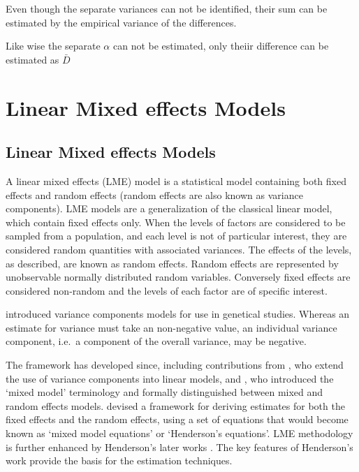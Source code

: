 \documentclass[12pt, a4paper]{report}
\theoremstyle{plain}
\theoremstyle{definition}
\theoremstyle{remark}
\begin{document}
Even though the separate variances can not be identified, their sum can be estimated by the empirical variance of the differences.

Like wise the separate $\alpha$ can not be estimated, only theiir difference can be estimated as $\bar{D}$




\chapter{Linear Mixed effects Models}
\section{Linear Mixed effects Models}
A linear mixed effects (LME) model is a statistical model containing both fixed effects and random effects (random effects are also known as variance components). LME models are a generalization of the classical linear model, which contain fixed effects only. When the levels of factors are considered to be sampled from a population,
and each level is not of particular interest, they are considered random quantities with associated variances.
The effects of the levels, as described, are known as random effects. Random effects are represented by unobservable
normally distributed random variables. Conversely fixed effects are considered non-random and the
levels of each factor are of specific interest.

\citet{Fisher4} introduced variance components models for use in genetical studies. Whereas an estimate for variance must take an non-negative value, an individual variance component, i.e.\ a component of the overall variance, may be negative.


The framework has developed since, including contributions from
\citet{tippett}, who extend the use of variance components into linear models, and \citet{eisenhart}, who introduced the `mixed model' terminology and formally distinguished between mixed and random effects models. \citet{Henderson:1950} devised a framework for deriving estimates for both the fixed effects and the random effects, using a set of equations that would become known as `mixed model equations' or `Henderson's equations'.
LME methodology is further enhanced by Henderson's later works \citep{Henderson53, Henderson59,Henderson63,Henderson73,Henderson84a}. The key features of Henderson's work provide the basis for the estimation techniques.
\end{document}
